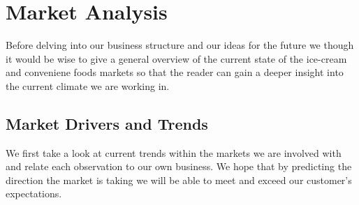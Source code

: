 \documentclass{article}
\begin{document}
\section{Market Analysis}
  
  Before delving into our business structure and our ideas for the future we though it would be wise to give a general overview of the current state of the ice-cream and conveniene foods markets so that the reader can gain a deeper insight into the current climate we are working in.

  \subsection{Market Drivers and Trends}

   We first take a look at current trends within the markets we are involved with and relate each observation to our own business. We hope that by predicting the direction the market is taking we will be able to meet and exceed our customer's expectations.
   
\end{document}
